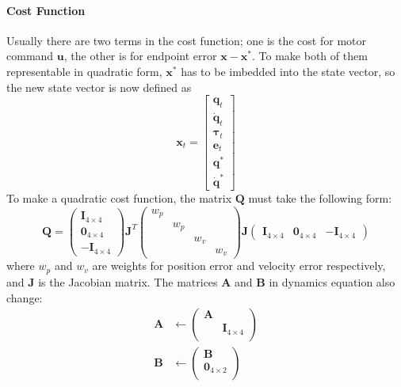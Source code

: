 \paragraph{Cost Function}
\label{app:cost}
Usually there are two terms in the cost function; one is the cost for motor command $\bm{u}$, the other is for endpoint error $\bm{x} - \bm{x}^*$. To make both of them representable in quadratic form, $\bm{x}^*$ has to be imbedded into the state vector, so the new state vector is now defined as
\begin{equation}
\bm{x}_t=\left[ \begin{matrix}\bm{q}_t \\ \dot{\bm{q}}_t \\ \bm{\tau}_t \\ \bm{e}_t \\
\bm{q}^* \\ \dot{\bm{q}}^*
\end{matrix} \right]
\end{equation}
To make a quadratic cost function, the matrix $\bm{Q}$ must take the following form:
\begin{equation}
\bm{Q} = 
\left( \begin{matrix}
\bm{I}_{4\times4} \\
\bm{0}_{4\times4} \\
\bm{-I}_{4\times4} 
\end{matrix} \right)
\bm{J}^T
\left( \begin{matrix}
w_p &&&\\
&w_p&& \\
&&w_v&\\
&&&w_v 
\end{matrix} \right)
\bm{J}
\left( \begin{matrix}
\bm{I}_{4\times4} &
\bm{0}_{4\times4} &
\bm{-I}_{4\times4} 
\end{matrix} \right)
\end{equation}
where $w_p$ and $w_v$ are weights for position error and velocity error respectively, and $\bm{J}$ is the Jacobian matrix. The matrices $\bm{A}$ and $\bm{B}$ in dynamics equation also change:
\begin{equation}
\begin{split}
\bm{A} & \leftarrow \left( \begin{matrix}
\bm{A} \\
&\bm{I}_{4\times4} \\
\end{matrix} \right) \\
\bm{B} & \leftarrow \left( \begin{matrix}
\bm{B} \\
\bm{0}_{4\times2} \\
\end{matrix} \right)
\end{split}
\end{equation}
